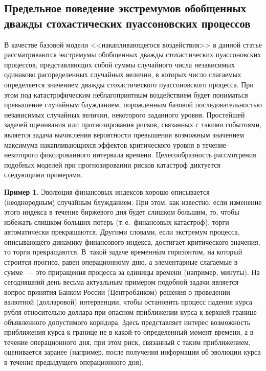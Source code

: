 \begin{multicols}{2}
\section{Предельное поведение экстремумов обобщенных дважды стохастических
пуассоновских процессов}

В качестве базовой модели <<накапливающегося\linebreak
 воздействия>> в данной
статье рассматриваются экстремумы обобщенных дважды стохастических
пуассоновских процессов, представляющих собой суммы случайного числа
независимых одинаково распреде\-лен\-ных случайных величин, в которых
число слагаемых определяется значением дважды стохастического
пуассоновского процесса. При этом под катастрофическим
неблагоприятным воздействием будет пониматься превышение случайным
блужданием, порожденным базовой последовательностью независимых
случайных величин, некоторого заданного уровня. Простейшей задачей
оценивания или прогнозирования рисков, связанных с такими событиями,
является задача вычисления ве\-ро\-ят\-ности превышения возможным
значением максимума накапливающихся эффектов критического уровня в
течение некоторого фиксированного интервала времени.
Целесообразность рассмотрения подобных моделей при прогнозировании
рисков катастроф диктуется следующими примерами.

\medskip

\noindent
\textbf{Пример 1}. Эволюция финансовых индексов хорошо описывается
(неоднородным) случайным блуж\-да\-ни\-ем. При этом, как известно, если
изменение этого индекса в течение биржевого дня будет слишком
большим, то, чтобы избежать слишком больших потерь (т.\,е.\
финансовых катастроф), торги автоматически прекращаются. Другими
словами, если экстремум процесса, описывающего динамику финансового
индекса, достигает критического значения, то торги прекращаются. 
В~такой задаче временн$\acute{\mbox{ы}}$м горизонтом, на который строится прогноз,
равен операционному дню, а элементарные слагаемые в сумме~--- это
приращения процесса за единицы времени (например, минуты). На
сегодняшний день весьма актуальным примером подобной задачи является
вопрос принятия Банком России (Центробанком) решения о проведении
валютной (долларовой) интервенции, чтобы остановить процесс падения
курса рубля относительно доллара при опасном приближении курса к
верхней границе объявленного допустимого коридора. Здесь
представляет интерес возможность приближения курса к границе не в
какой-то определенный момент времени, а в течение операционного дня,
при этом риск, связанный с таким приближением, оценивается заранее
(например, после получения информации об эволюции курса в течение
предыду\-ще\-го операционного дня).


\end{multicols}
